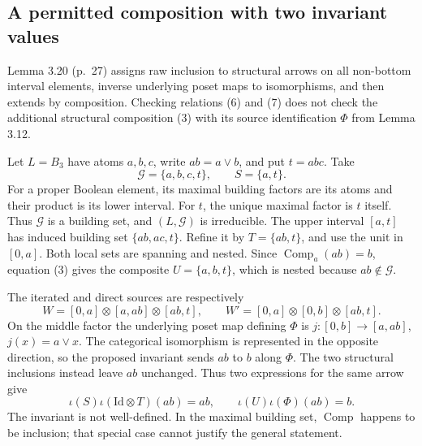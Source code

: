 \documentclass[10pt]{article}
\begin{document}
\subsection*{A permitted composition with two invariant values}
Lemma 3.20 (p. 27) assigns raw inclusion to structural arrows on all non-bottom interval elements, inverse underlying poset maps to isomorphisms, and then extends by composition. Checking relations (6) and (7) does not check the additional structural composition (3) with its source identification \(\Phi\) from Lemma 3.12.\par
Let \(L=B_3\) have atoms \(a,b,c\), write \(ab=a\vee b\), and put \(t=abc\). Take \[\mathcal G=\{a,b,c,t\},\qquad S=\{a,t\}.\] For a proper Boolean element, its maximal building factors are its atoms and their product is its lower interval. For \(t\), the unique maximal factor is \(t\) itself. Thus \(\mathcal G\) is a building set, and \((L,\mathcal G)\) is irreducible. The upper interval \([a,t]\) has induced building set \(\{ab,ac,t\}\). Refine it by \(T=\{ab,t\}\), and use the unit in \([0,a]\). Both local sets are spanning and nested. Since \(\operatorname{Comp}_a(ab)=b\), equation (3) gives the composite \(U=\{a,b,t\}\), which is nested because \(ab\notin\mathcal G\).\par
The iterated and direct sources are respectively \[W=[0,a]\otimes[a,ab]\otimes[ab,t],\qquad
 W'=[0,a]\otimes[0,b]\otimes[ab,t].\] On the middle factor the underlying poset map defining \(\Phi\) is \(j:[0,b]\to[a,ab]\), \(j(x)=a\vee x\). The categorical isomorphism is represented in the opposite direction, so the proposed invariant sends \(ab\) to \(b\) along \(\Phi\). The two structural inclusions instead leave \(ab\) unchanged. Thus two expressions for the same arrow give \[\iota(S)\iota(\mathrm{Id}\otimes T)(ab)=ab,\qquad
 \iota(U)\iota(\Phi)(ab)=b.\] The invariant is not well-defined. In the maximal building set, \(\operatorname{Comp}\) happens to be inclusion; that special case cannot justify the general statement.\par
\end{document}
